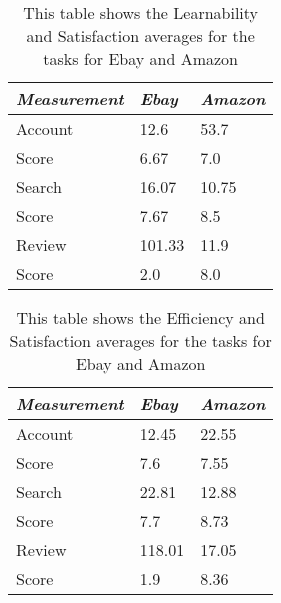 \documentclass{article}
\begin{document}
\begin{table}
\centering
\begin{tabular}{|l||l|l|}
  \hline
  \emph {Measurement} & \emph{Ebay} & \emph{Amazon}\\
  \hline
  Account & 12.6 & 53.7\\
  \hline
  Score & 6.67 & 7.0\\
  \hline
  Search & 16.07 & 10.75\\
  \hline
  Score & 7.67 & 8.5\\
  \hline
  Review & 101.33 & 11.9\\
  \hline
  Score & 2.0 & 8.0\\
  \hline
\end{tabular}
\caption{This table shows the Learnability and Satisfaction averages for the tasks for Ebay and Amazon}
\end{table}

\begin{table}[htbp]
\centering
\begin{tabular}{|l||l|l|}
  \hline
  \emph {Measurement} & \emph{Ebay} & \emph{Amazon}\\
  \hline
  Account & 12.45 & 22.55\\
  \hline
  Score & 7.6 & 7.55\\
  \hline
  Search & 22.81 & 12.88\\
  \hline
  Score & 7.7 & 8.73\\
  \hline
  Review & 118.01 & 17.05\\
  \hline
  Score & 1.9 & 8.36\\
  \hline
\end{tabular}
\caption{This table shows the Efficiency and Satisfaction averages for the tasks for Ebay and Amazon}
\end{table}
\end{document}
